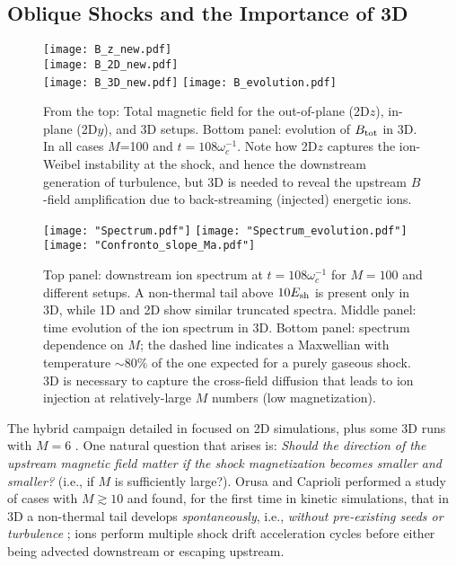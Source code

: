 \documentclass[varenna]{cimento}
\newcommand{\omci}{\omega_c^{-1}}
\newcommand{\esh}{E_{\rm sh}}
\begin{document}
\subsection{Oblique Shocks and the Importance of 3D}\label{sec:3D}
\begin{figure}[t]
\begin{center}
    \texttt{[image: B\_z\_new.pdf]}
    \\
    \texttt{[image: B\_2D\_new.pdf]}
    \\
    \texttt{[image: B\_3D\_new.pdf]}
    \texttt{[image: B\_evolution.pdf]}
    \end{center}
    \caption{From the top: Total magnetic field for the out-of-plane (2D$z$), in-plane (2D$y$), and 3D setups. Bottom panel: evolution of $B_{\rm tot}$ in 3D. In all cases $M$=100 and $t=108 \omega_c^{-1}$.
    Note how 2D$z$ captures the ion-Weibel instability at the shock, and hence the downstream generation of turbulence, but 3D is needed to reveal the upstream $B$-field amplification due to back-streaming (injected) energetic ions.} 
    \label{Fig:B_field}
\end{figure}

\begin{figure}
\begin{center}
    \texttt{[image: "Spectrum.pdf"]}
    \texttt{[image: "Spectrum\_evolution.pdf"]}
    \texttt{[image: "Confronto\_slope\_Ma.pdf"]}
    \caption{Top panel: downstream ion spectrum  at $t=108 \omci$ for $M=100$ and different setups.
    A non-thermal tail above $10\esh$ is present only in 3D, while  1D and 2D show similar truncated spectra. 
    Middle panel: time evolution of the ion spectrum in 3D. 
    Bottom panel: spectrum dependence on $M$; the dashed line indicates a Maxwellian with temperature $\sim 80\%$ of the one expected for a purely gaseous shock.
    3D is necessary to capture the cross-field diffusion that leads to ion injection at relatively-large $M$ numbers (low magnetization). } 
    \label{Fig:Spectrum_example}
    \end{center}
\end{figure}

The hybrid campaign detailed in \cite{caprioli+14a,caprioli+14b,caprioli+14c, haggerty+20,caprioli+20} focused on 2D simulations, plus some 3D runs with $M=6$ \cite{caprioli+14a}. 
One natural question that arises is: \emph{Should the direction of the upstream magnetic field matter if the shock magnetization becomes smaller and smaller?} (i.e., if $M$ is sufficiently large?).
Orusa and Caprioli \cite{orusa+23} performed a study of cases with  $M\gtrsim 10$ and found, for the first time in kinetic simulations, that  in 3D a non-thermal tail develops \emph{spontaneously}, i.e., \emph{without pre-existing seeds or turbulence} \cite{giacalone05,lembege+04, caprioli+18}; ions perform multiple shock drift acceleration cycles before either being advected downstream or escaping upstream.
\end{document}
